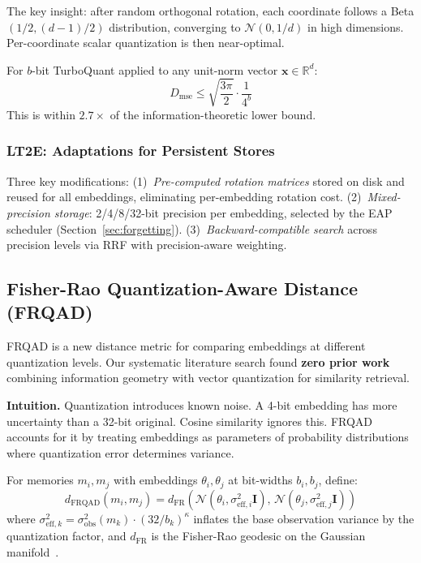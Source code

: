 The key insight: after random orthogonal rotation, each coordinate follows a Beta$(1/2, (d{-}1)/2)$ distribution, converging to $\mathcal{N}(0, 1/d)$ in high dimensions. Per-coordinate scalar quantization is then near-optimal.

\begin{theorem}
\label{thm:turboquant-mse}
For $b$-bit TurboQuant applied to any unit-norm vector $\mathbf{x} \in \mathbb{R}^d$:
\begin{equation}
D_{\text{mse}} \leq \sqrt{\frac{3\pi}{2}} \cdot \frac{1}{4^b}
\end{equation}
This is within $2.7\times$ of the information-theoretic lower bound.
\end{theorem}

\subsubsection{LT2E: Adaptations for Persistent Stores}

Three key modifications: (1)~\emph{Pre-computed rotation matrices} stored on disk and reused for all embeddings, eliminating per-embedding rotation cost. (2)~\emph{Mixed-precision storage}: 2/4/8/32-bit precision per embedding, selected by the EAP scheduler (Section~\ref{sec:forgetting}). (3)~\emph{Backward-compatible search} across precision levels via RRF with precision-aware weighting.

\subsection{Fisher-Rao Quantization-Aware Distance (FRQAD)}
\label{sec:frqad}

FRQAD is a new distance metric for comparing embeddings at different quantization levels. Our systematic literature search found \textbf{zero prior work} combining information geometry with vector quantization for similarity retrieval.

\textbf{Intuition.} Quantization introduces known noise. A 4-bit embedding has more uncertainty than a 32-bit original. Cosine similarity ignores this. FRQAD accounts for it by treating embeddings as parameters of probability distributions where quantization error determines variance.

\begin{definition}[FRQAD]
For memories $m_i, m_j$ with embeddings $\theta_i, \theta_j$ at bit-widths $b_i, b_j$, define:
\begin{equation}
d_{\text{FRQAD}}(m_i, m_j) = d_{\text{FR}}\left(\mathcal{N}(\theta_i, \sigma^2_{\text{eff},i} \mathbf{I}), \, \mathcal{N}(\theta_j, \sigma^2_{\text{eff},j} \mathbf{I})\right)
\end{equation}
where $\sigma^2_{\text{eff},k} = \sigma^2_{\text{obs}}(m_k) \cdot (32/b_k)^{\kappa}$ inflates the base observation variance by the quantization factor, and $d_{\text{FR}}$ is the Fisher-Rao geodesic on the Gaussian manifold~\cite{amari-info-geo}.
\end{definition}

